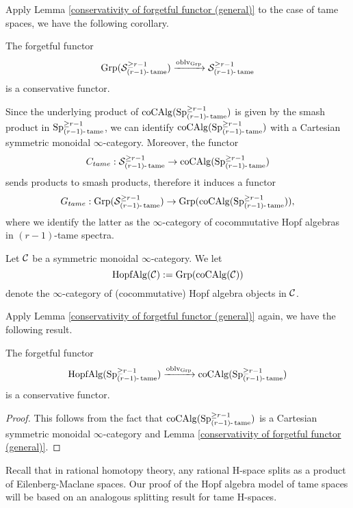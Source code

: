Apply Lemma \ref{conservativity of forgetful functor (general)} to the case of tame spaces, we have the following corollary.

\begin{corollary}
\label{conservativity of forgetful functor}
	The forgetful functor 
	\[
	\operatorname{Grp}({\mathcal{S}}^{\geq r-1}_{(r-1)\text{-}\operatorname{\operatorname{tame}}}) \xrightarrow{\operatorname{oblv}_{\operatorname{Grp}}} 
	{\mathcal{S}}^{\geq r-1}_{(r-1)\text{-}\operatorname{\operatorname{tame}}}
	\]
	is a conservative functor.
\end{corollary}

Since the underlying product of $\operatorname{coCAlg}(\operatorname{Sp}^{\geq r-1}_{(r-1)\text{-}\operatorname{\operatorname{tame}}})$ is given by the smash product in $\operatorname{Sp}^{\geq r-1}_{(r-1)\text{-}\operatorname{\operatorname{tame}}}$, we can identify $\operatorname{coCAlg}(\operatorname{Sp}^{\geq r-1}_{(r-1)\text{-}\operatorname{\operatorname{tame}}})$ with a Cartesian symmetric monoidal $\infty$-category. Moreover, the functor 
$$C_{tame}: {\mathcal{S}}^{\geq r-1}_{(r-1)\text{-}\operatorname{\operatorname{tame}}} \to
\operatorname{coCAlg}(\operatorname{Sp}^{\geq r-1}_{(r-1)\text{-}\operatorname{\operatorname{tame}}})$$
sends products to smash products, therefore it induces a functor
$$
G_{tame}:\operatorname{Grp}({\mathcal{S}}^{\geq r-1}_{(r-1)\text{-}\operatorname{\operatorname{tame}}})
\to
\operatorname{Grp}(\operatorname{coCAlg}(\operatorname{Sp}^{\geq r-1}_{(r-1)\text{-}\operatorname{\operatorname{tame}}})),
$$
where we identify the latter as the $\infty$-category of cocommutative Hopf algebras in $(r-1)$-tame spectra.

\begin{definition}
	Let ${\mathcal{C}}$ be a symmetric monoidal $\infty$-category. We let 
	$$
	\operatorname{HopfAlg}({\mathcal{C}}):=\operatorname{Grp}(\operatorname{coCAlg}({\mathcal{C}}))
	$$
	denote the $\infty$-category of (cocommutative) Hopf algebra objects in ${\mathcal{C}}$.
\end{definition}


Apply Lemma \ref{conservativity of forgetful functor (general)} again, we have the following result.
\begin{corollary}
\label{conservativity of the forgetful functor for Hopf algebras}
		The forgetful functor 
	\[
	\operatorname{HopfAlg}(\operatorname{Sp}^{\geq r-1}_{(r-1)\text{-}\operatorname{\operatorname{tame}}}) \xrightarrow{\operatorname{oblv}_{\operatorname{Grp}}} 
	\operatorname{coCAlg}(\operatorname{Sp}^{\geq r-1}_{(r-1)\text{-}\operatorname{\operatorname{tame}}})
	\]
	is a conservative functor.
\end{corollary}
\begin{proof}
	This follows from the fact that $\operatorname{coCAlg}(\operatorname{Sp}^{\geq r-1}_{(r-1)\text{-}\operatorname{\operatorname{tame}}})$ is a Cartesian symmetric monoidal $\infty$-category and Lemma \ref{conservativity of forgetful functor (general)}.
\end{proof}

Recall that in rational homotopy theory, any rational H-space splits as a product of Eilenberg-Maclane spaces.
Our proof of the Hopf algebra model of tame spaces will be based on an analogous splitting result for tame H-spaces.


